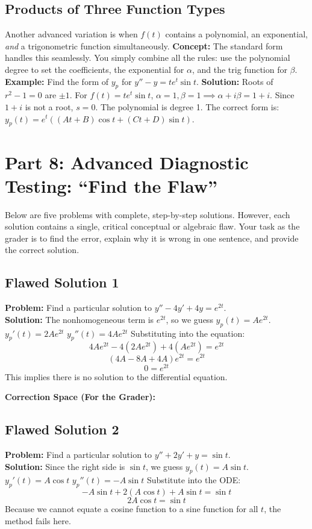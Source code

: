 \documentclass[12pt]{article}
\begin{document}
\subsection{Products of Three Function Types}
Another advanced variation is when $f(t)$ contains a polynomial, an exponential, \textit{and} a trigonometric function simultaneously.
\textbf{Concept:} The standard form handles this seamlessly. You simply combine all the rules: use the polynomial degree to set the coefficients, the exponential for $\alpha$, and the trig function for $\beta$.
\textbf{Example:} Find the form of $y_p$ for $y'' - y = t e^t \sin t$.
\textbf{Solution:}
Roots of $r^2 - 1 = 0$ are $\pm 1$.
For $f(t) = t e^t \sin t$, $\alpha = 1, \beta = 1 \implies \alpha + i\beta = 1 + i$.
Since $1+i$ is not a root, $s=0$.
The polynomial is degree 1.
The correct form is: $y_p(t) = e^t \left( (At + B)\cos t + (Ct + D)\sin t \right)$.

\newpage
\section{Part 8: Advanced Diagnostic Testing: ``Find the Flaw''}

Below are five problems with complete, step-by-step solutions. However, each solution contains a single, critical conceptual or algebraic flaw. Your task as the grader is to find the error, explain why it is wrong in one sentence, and provide the correct solution.

\subsection{Flawed Solution 1}
\textbf{Problem:} Find a particular solution to $y'' - 4y' + 4y = e^{2t}$. \\
\textbf{Solution:}
The nonhomogeneous term is $e^{2t}$, so we guess $y_p(t) = A e^{2t}$.
$y_p'(t) = 2A e^{2t}$
$y_p''(t) = 4A e^{2t}$
Substituting into the equation:
\[ 4A e^{2t} - 4(2A e^{2t}) + 4(A e^{2t}) = e^{2t} \]
\[ (4A - 8A + 4A)e^{2t} = e^{2t} \]
\[ 0 = e^{2t} \]
This implies there is no solution to the differential equation.

\textbf{Correction Space (For the Grader):}
\vspace{2cm}

\subsection{Flawed Solution 2}
\textbf{Problem:} Find a particular solution to $y'' + 2y' + y = \sin t$. \\
\textbf{Solution:}
Since the right side is $\sin t$, we guess $y_p(t) = A \sin t$.
$y_p'(t) = A \cos t$
$y_p''(t) = -A \sin t$
Substitute into the ODE:
\[ -A \sin t + 2(A \cos t) + A \sin t = \sin t \]
\[ 2A \cos t = \sin t \]
Because we cannot equate a cosine function to a sine function for all $t$, the method fails here.
\end{document}
